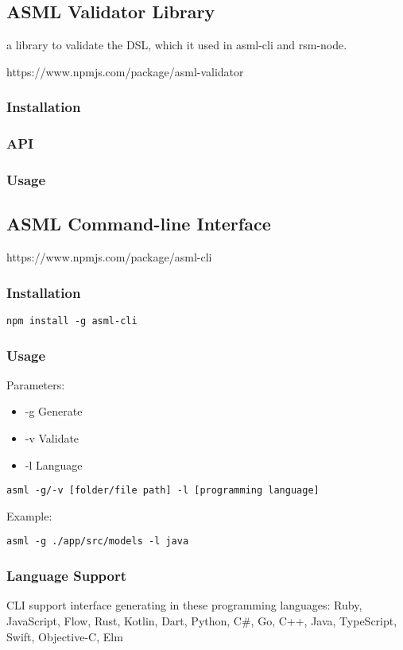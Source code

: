\subsection{ASML Validator Library}
a library to validate the DSL, which it used in asml-cli and rsm-node.

https://www.npmjs.com/package/asml-validator

\subsubsection{Installation}
\subsubsection{API}
\subsubsection{Usage}

\subsection{ASML Command-line Interface}
https://www.npmjs.com/package/asml-cli

\subsubsection{Installation}
\begin{verbatim}
npm install -g asml-cli
\end{verbatim}
\subsubsection{Usage}
Parameters:
\begin{itemize}
\item -g Generate
\item -v Validate
\item -l Language
\end{itemize}
\begin{verbatim}
asml -g/-v [folder/file path] -l [programming language]
\end{verbatim}
Example:
\begin{verbatim}
asml -g ./app/src/models -l java
\end{verbatim}
\subsubsection{Language Support}
CLI support interface generating in these programming languages:
Ruby, JavaScript, Flow, Rust, Kotlin, Dart, Python, C\#, Go, C++, Java, TypeScript, Swift, Objective-C, Elm